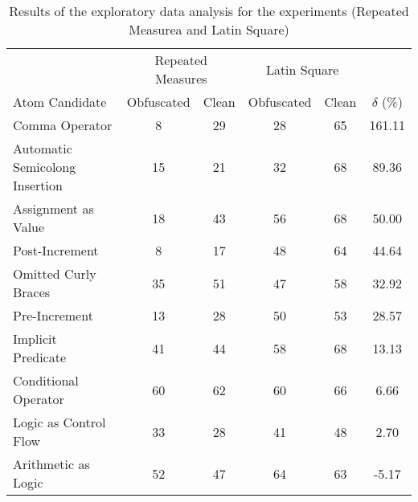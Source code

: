 \begin{table}
  \caption{Results of the exploratory data analysis for the experiments (Repeated Measurea and Latin Square)}
  \label{tab:merge-exploratory-study}
  \begin{scriptsize}
  \begin{tabular}{lccccc} \toprule
                                 & \multicolumn{2}{c}{Repeated Measures} & \multicolumn{2}{c}{Latin Square} & \\  
  Atom Candidate                 &   Obfuscated   &   Clean   &   Obfuscated   &   Clean   &  $\delta$ (\%)    \\ \midrule
Comma Operator                   &      8         &   29      &       28       &     65    &   161.11  \\
Automatic Semicolong Insertion   &     15         &   21      &       32       &     68    &    89.36  \\
Assignment as Value              &     18         &   43      &       56       &     68    &    50.00  \\
Post-Increment                   &      8         &   17      &       48       &     64    &    44.64  \\
Omitted Curly Braces             &     35         &   51      &       47       &     58    &    32.92  \\
Pre-Increment                    &     13         &   28      &       50       &     53    &    28.57  \\
Implicit Predicate               &     41         &   44      &       58       &     68    &    13.13  \\
Conditional Operator             &     60         &   62      &       60       &     66    &     6.66  \\
Logic as Control Flow            &     33         &   28      &       41       &     48    &     2.70  \\ 
Arithmetic as Logic              &     52         &   47      &       64       &     63    &    -5.17  \\ \bottomrule
  \end{tabular}
\end{scriptsize}  
\end{table}


